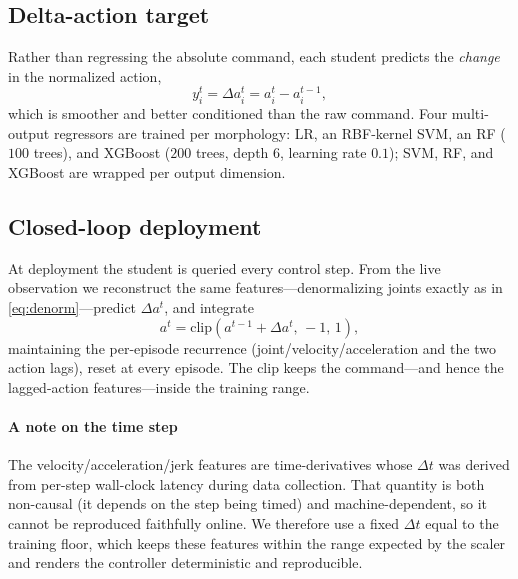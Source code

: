 \documentclass[conference]{IEEEtran}
\begin{document}
\subsection{Delta-action target}
Rather than regressing the absolute command, each student predicts the
\emph{change} in the normalized action,
\begin{equation}
y_i^{t}=\Delta a_i^{t}=a_i^{t}-a_i^{t-1},
\label{eq:delta}
\end{equation}
which is smoother and better conditioned than the raw command. Four multi-output
regressors are trained per morphology: LR, an RBF-kernel SVM, an RF
($100$ trees), and XGBoost ($200$ trees, depth $6$, learning rate $0.1$); SVM,
RF, and XGBoost are wrapped per output dimension.

\subsection{Closed-loop deployment}
At deployment the student is queried every control step. From the live
observation we reconstruct the same features---denormalizing joints exactly as in
\eqref{eq:denorm}---predict $\Delta a^{t}$, and integrate
\begin{equation}
a^{t}=\mathrm{clip}\!\left(a^{t-1}+\Delta a^{t},\,-1,\,1\right),
\label{eq:integrate}
\end{equation}
maintaining the per-episode recurrence (joint/velocity/acceleration and the two
action lags), reset at every episode. The clip keeps the command---and hence the
lagged-action features---inside the training range.

\paragraph*{A note on the time step}
The velocity/acceleration/jerk features are time-derivatives whose $\Delta t$ was
derived from per-step wall-clock latency during data collection. That quantity is
both non-causal (it depends on the step being timed) and machine-dependent, so it
cannot be reproduced faithfully online. We therefore use a fixed
$\Delta t$ equal to the training floor, which keeps these features within the
range expected by the scaler and renders the controller deterministic and
reproducible.

\end{document}
